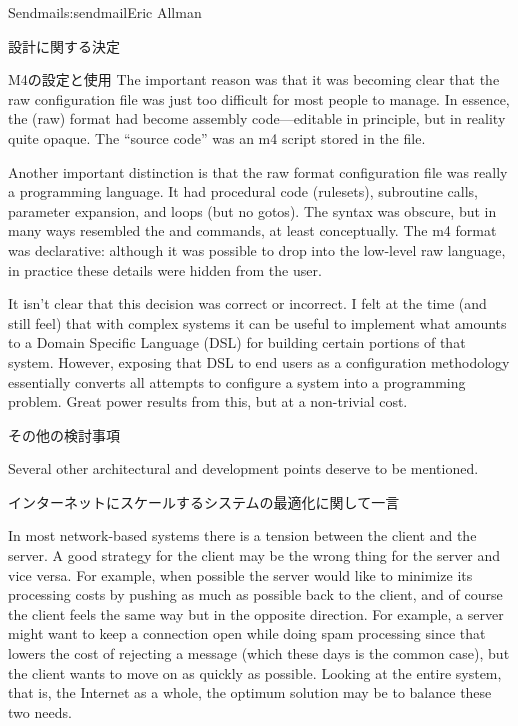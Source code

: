\begin{aosachapter}{Sendmail}{s:sendmail}{Eric Allman}
\begin{aosasect1}{設計に関する決定}
\begin{aosasect2}{M4の設定と使用}
The important reason was that it was becoming clear that the raw
configuration file was just too difficult for most people to
manage. In essence, the  (raw) format had become assembly
code---editable in principle, but in reality quite opaque. The
``source code'' was an m4 script stored in the  file.

Another important distinction is that the raw format configuration
file was really a programming language. It had procedural code
(rulesets), subroutine calls, parameter expansion, and loops (but no
gotos). The syntax was obscure, but in many ways resembled
the  and  commands, at
least conceptually. The m4 format was declarative: although it was
possible to drop into the low-level raw language, in practice these
details were hidden from the user.

It isn't clear that this decision was correct or incorrect.
I felt at the time (and still feel) that with complex systems
it can be useful to implement what amounts to a Domain Specific Language (DSL)
for building certain portions of that system.
However, exposing that DSL to end users as a configuration methodology
essentially converts all attempts to configure a system
into a programming problem.
Great power results from this, but at a non-trivial cost.

\end{aosasect2}

\end{aosasect1}

\begin{aosasect1}{その他の検討事項}

Several other architectural and development points deserve to be
mentioned.

\begin{aosasect2}{インターネットにスケールするシステムの最適化に関して一言}

In most network-based systems there is a tension between the client
and the server. A good strategy for the client may be the
wrong thing for the server and vice versa. For example, when possible
the server would like to minimize its processing costs by pushing as
much as possible back to the client, and of course the client feels
the same way but in the opposite direction. For example, a server
might want to keep a connection open while doing spam processing since
that lowers the cost of rejecting a message (which these days is the
common case), but the client wants to move on as quickly as
possible. Looking at the entire system, that is, the Internet as a
whole, the optimum solution may be to balance these two needs.


\end{aosasect2}
\end{aosasect1}
\end{aosachapter}
